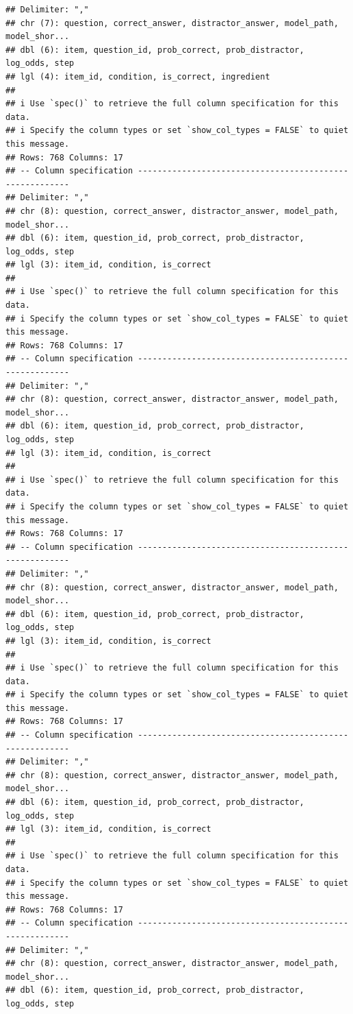 \documentclass[
]{article}
\begin{document}
\begin{verbatim}
## Delimiter: ","
## chr (7): question, correct_answer, distractor_answer, model_path, model_shor...
## dbl (6): item, question_id, prob_correct, prob_distractor, log_odds, step
## lgl (4): item_id, condition, is_correct, ingredient
## 
## i Use `spec()` to retrieve the full column specification for this data.
## i Specify the column types or set `show_col_types = FALSE` to quiet this message.
## Rows: 768 Columns: 17
## -- Column specification --------------------------------------------------------
## Delimiter: ","
## chr (8): question, correct_answer, distractor_answer, model_path, model_shor...
## dbl (6): item, question_id, prob_correct, prob_distractor, log_odds, step
## lgl (3): item_id, condition, is_correct
## 
## i Use `spec()` to retrieve the full column specification for this data.
## i Specify the column types or set `show_col_types = FALSE` to quiet this message.
## Rows: 768 Columns: 17
## -- Column specification --------------------------------------------------------
## Delimiter: ","
## chr (8): question, correct_answer, distractor_answer, model_path, model_shor...
## dbl (6): item, question_id, prob_correct, prob_distractor, log_odds, step
## lgl (3): item_id, condition, is_correct
## 
## i Use `spec()` to retrieve the full column specification for this data.
## i Specify the column types or set `show_col_types = FALSE` to quiet this message.
## Rows: 768 Columns: 17
## -- Column specification --------------------------------------------------------
## Delimiter: ","
## chr (8): question, correct_answer, distractor_answer, model_path, model_shor...
## dbl (6): item, question_id, prob_correct, prob_distractor, log_odds, step
## lgl (3): item_id, condition, is_correct
## 
## i Use `spec()` to retrieve the full column specification for this data.
## i Specify the column types or set `show_col_types = FALSE` to quiet this message.
## Rows: 768 Columns: 17
## -- Column specification --------------------------------------------------------
## Delimiter: ","
## chr (8): question, correct_answer, distractor_answer, model_path, model_shor...
## dbl (6): item, question_id, prob_correct, prob_distractor, log_odds, step
## lgl (3): item_id, condition, is_correct
## 
## i Use `spec()` to retrieve the full column specification for this data.
## i Specify the column types or set `show_col_types = FALSE` to quiet this message.
## Rows: 768 Columns: 17
## -- Column specification --------------------------------------------------------
## Delimiter: ","
## chr (8): question, correct_answer, distractor_answer, model_path, model_shor...
## dbl (6): item, question_id, prob_correct, prob_distractor, log_odds, step

\end{verbatim}
\end{document}
